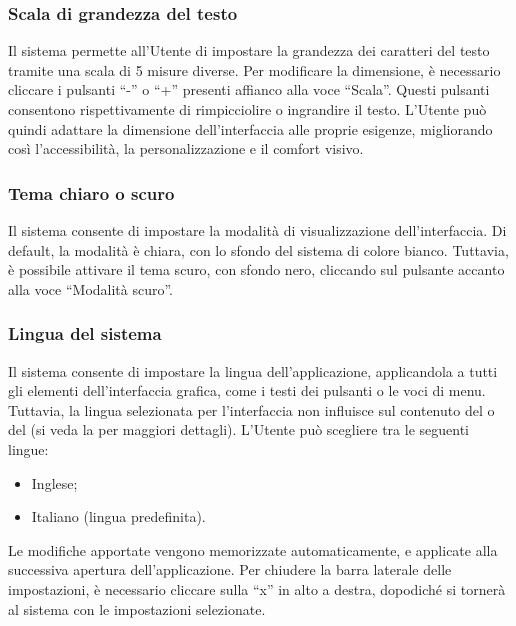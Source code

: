 \subsubsection{Scala di grandezza del testo}

\par Il sistema permette all'Utente di impostare la grandezza dei caratteri del testo tramite una scala di 5 misure diverse. Per modificare la dimensione, è necessario cliccare i pulsanti ``-'' o ``+'' presenti affianco alla voce ``Scala''. Questi pulsanti consentono rispettivamente di rimpicciolire o ingrandire il testo. L'Utente può quindi adattare la dimensione dell'interfaccia alle proprie esigenze, migliorando così l'accessibilità, la personalizzazione e il comfort visivo.

\subsubsection{Tema chiaro o scuro} \label{sec:tema}

\par Il sistema consente di impostare la modalità di visualizzazione dell'interfaccia. Di default, la modalità è chiara, con lo sfondo del sistema di colore bianco. Tuttavia, è possibile attivare il tema scuro, con sfondo nero, cliccando sul pulsante accanto alla voce ``Modalità scuro''.

\subsubsection{Lingua del sistema} \label{sec:lingua}

\par Il sistema consente di impostare la lingua dell'applicazione, applicandola a tutti gli elementi dell'interfaccia grafica, come i testi dei pulsanti o le voci di menu. Tuttavia, la lingua selezionata per l'interfaccia non influisce sul contenuto del  o del  (si veda la  per maggiori dettagli). L'Utente può scegliere tra le seguenti lingue:
\begin{itemize}
  \item Inglese;
  \item Italiano (lingua predefinita).
\end{itemize}

\par Le modifiche apportate vengono memorizzate automaticamente, e applicate alla successiva apertura dell'applicazione. Per chiudere la barra laterale delle impostazioni, è necessario cliccare sulla ``x'' in alto a destra, dopodiché si tornerà al sistema con le impostazioni selezionate.
